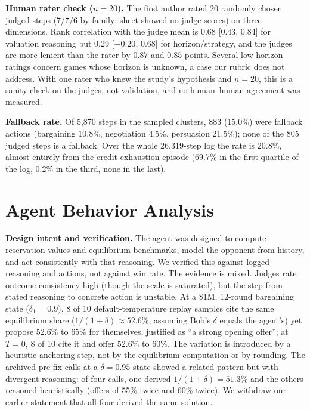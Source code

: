 \documentclass{article}
\begin{document}
\textbf{Human rater check ($n=20$).} The first author rated 20 randomly chosen judged steps (7/7/6 by family; sheet showed no judge scores) on three dimensions. Rank correlation with the judge mean is $0.68$ [0.43, 0.84] for valuation reasoning but $0.29$ [$-0.20$, $0.68$] for horizon/strategy, and the judges are more lenient than the rater by $0.87$ and $0.85$ points. Several low horizon ratings concern games whose horizon is unknown, a case our rubric does not address. With one rater who knew the study's hypothesis and $n=20$, this is a sanity check on the judges, not validation, and no human--human agreement was measured.

\textbf{Fallback rate.}\label{sec:fallback} Of 5{,}870 steps in the sampled clusters, 883 (15.0\%) were fallback actions (bargaining 10.8\%, negotiation 4.5\%, persuasion 21.5\%); none of the 805 judged steps is a fallback. Over the whole 26{,}319-step log the rate is 20.8\%, almost entirely from the credit-exhaustion episode (69.7\% in the first quartile of the log, 0.2\% in the third, none in the last).

\section{Agent Behavior Analysis}
\label{sec:aba}

\textbf{Design intent and verification.} The agent was designed to compute reservation values and equilibrium benchmarks, model the opponent from history, and act consistently with that reasoning. We verified this against logged reasoning and actions, not against win rate. The evidence is mixed. Judges rate outcome consistency high (though the scale is saturated), but the step from stated reasoning to concrete action is unstable. At a \$1M, 12-round bargaining state ($\delta_1=0.9$), 8 of 10 default-temperature replay samples cite the same equilibrium share ($1/(1+\delta)\approx 52.6\%$, assuming Bob's $\delta$ equals the agent's) yet propose $52.6\%$ to $65\%$ for themselves, justified as ``a strong opening offer''; at $T=0$, 8 of 10 cite it and offer $52.6\%$ to $60\%$. The variation is introduced by a heuristic anchoring step, not by the equilibrium computation or by rounding. The archived pre-fix calls at a $\delta=0.95$ state showed a related pattern but with divergent reasoning: of four calls, one derived $1/(1+\delta)=51.3\%$ and the others reasoned heuristically (offers of 55\% twice and 60\% twice). We withdraw our earlier statement that all four derived the same solution.
\end{document}
